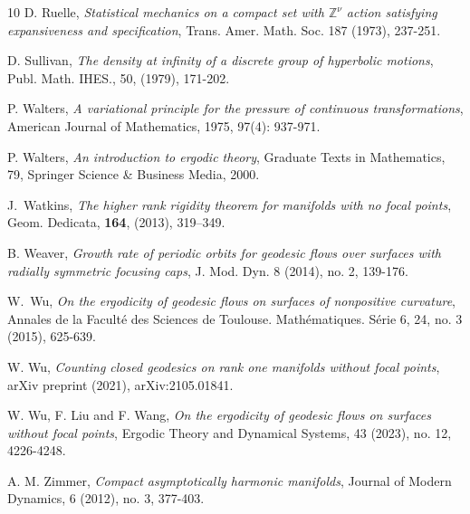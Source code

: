 \documentclass[11pt]{amsart}
\theoremstyle{definition}
\def\ZZ{{\mathbb Z}}
\begin{document}
\begin{thebibliography}{10}
D. Ruelle, \emph{Statistical mechanics on a compact set with $\ZZ^\nu$ action satisfying expansiveness and specification}, Trans. Amer. Math. Soc. 187 (1973), 237-251.

 D. Sullivan, \emph{The density at infinity of a discrete group of hyperbolic motions}, Publ. Math. IHES., 50, (1979), 171-202.

P. Walters, \emph{A variational principle for the pressure of continuous transformations}, American Journal of Mathematics, 1975, 97(4): 937-971.

P. Walters, \emph{An introduction to ergodic theory}, Graduate Texts in Mathematics, 79, Springer Science \& Business Media, 2000.


J.~Watkins, \emph{The higher rank rigidity theorem for manifolds with no focal points},
Geom. Dedicata, {\bf 164}, (2013), 319--349.

B. Weaver, \emph{Growth rate of periodic orbits for geodesic flows over
surfaces with radially symmetric focusing caps}, J. Mod. Dyn. 8 (2014), no. 2, 139-176.

W.~Wu, \emph{On the ergodicity of geodesic flows on surfaces of nonpositive curvature}, Annales de la Facult\'{e} des Sciences de Toulouse. Math\'{e}matiques. S\'{e}rie 6, 24,  no. 3 (2015), 625-639.

W. Wu, \emph{Counting closed geodesics on rank one manifolds without focal points}, arXiv preprint (2021), arXiv:2105.01841.

W. Wu, F. Liu and F. Wang, \emph{On the ergodicity of geodesic flows on surfaces without focal points}, Ergodic Theory and Dynamical Systems, 43 (2023), no. 12, 4226-4248.

A. M. Zimmer, \emph{Compact asymptotically harmonic manifolds}, Journal of Modern Dynamics, 6 (2012), no. 3, 377-403.
\end{thebibliography}
\end{document}
